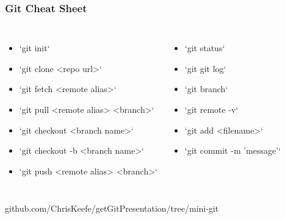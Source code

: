 \documentclass[unknownkeysallowed]{beamer}
\begin{document}
\begin{frame}
\frametitle{Git Cheat Sheet}
\begin{columns}
    \column{2.75in}
        \begin{itemize}
            \item{`git init`}
            \item{`git clone <repo url>`}
            \item{`git fetch <remote alias>`}
            \item{`git pull <remote alias> <branch>`}
            \item{`git checkout <branch name>`}
            \item{`git checkout -b <branch name>`}
            \item{`git push <remote alias> <branch>`}

        \end{itemize}
    \column{2.0in}
        \begin{itemize}
            \item{`git status`}
            \item{`git git log`}
            \item{`git branch`}
            \item{`git remote -v`}
            \item{`git add <filename>`}
            \item{`git commit -m 'message'`}
        \end{itemize}
    \end{columns}
	\vspace{.5cm}
	github.com/ChrisKeefe/getGitPresentation/tree/mini-git
\end{frame}
\end{document}
